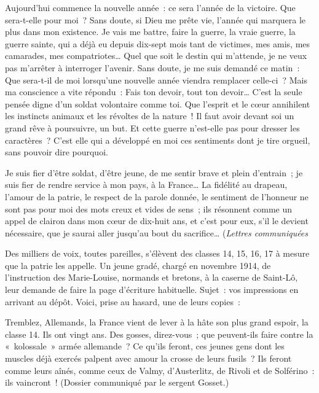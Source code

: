\documentclass[french,twoside]{book} %
\newenvironment{quoteblock}%
  {\begin{quoting}}
  {\end{quoting}}
\newenvironment{quotebar}{%
    \def\FrameCommand{{\color{rubric!10!}\vrule width 0.5em} \hspace{0.9em}}%
    \def\OuterFrameSep{\itemsep} %
    \MakeFramed {\advance\hsize-\width \FrameRestore}
  }%
  {%
    \endMakeFramed
  }
\renewenvironment{quoteblock}%
  {%
    \savenotes
    \setstretch{0.9}
    \normalfont
    \begin{quotebar}
  }
  {%
    \end{quotebar}
    \spewnotes
  }
\begin{document}
\begin{quoteblock}
 \noindent Aujourd’hui commence la nouvelle année : ce sera l’année de la victoire. Que sera-t-elle pour moi ? Sans doute, si Dieu me prête vie, l’année qui marquera le plus dans mon existence. Je vais me battre, faire la guerre, la vraie guerre, la guerre sainte, qui a déjà eu depuis dix-sept mois tant de victimes, mes amis, mes camarades, mes compatriotes… Quel que soit le destin qui m’attende, je ne veux pas m’arrêter à interroger l’avenir. Sans doute, je me suis demandé ce matin : Que sera-t-il de moi lorsqu’une nouvelle année viendra remplacer celle-ci ? Mais ma conscience a vite répondu : Fais ton devoir, tout ton devoir… C’est la seule pensée digne d’un soldat volontaire comme toi. Que l’esprit et le cœur annihilent les instincts animaux et les révoltes de la nature ! Il faut avoir devant soi un grand rêve à poursuivre, un but. Et cette guerre n’est-elle pas pour dresser les caractères ? C’est elle qui a développé en moi ces sentiments dont je tire orgueil, sans pouvoir dire pourquoi.‌\par
 Je suis fier d’être soldat, d’être jeune, de me sentir brave et plein d’entrain ; je suis fier de rendre service à mon pays, à la France… La fidélité au drapeau, l’amour de la patrie, le respect de la parole donnée, le sentiment de l’honneur ne sont pas pour moi des mots creux et vides de sens ; ils résonnent comme un appel de clairon dans mon cœur de dix-huit ans, et c’est pour eux, s’il le devient nécessaire, que je saurai aller jusqu’au bout du sacrifice… ({\itshape Lettres communiquées}‌
 \end{quoteblock}

\noindent Des milliers de voix, toutes pareilles, s’élèvent des classes 14, 15, 16, 17 à mesure que la patrie les appelle. Un jeune gradé, chargé en novembre 1914, de l’instruction des Marie-Louise, normands et bretons, à la caserne de Saint-Lô, leur demande de faire la page d’écriture habituelle. Sujet : vos impressions en arrivant au dépôt. Voici, prise au hasard, une de leurs copies :‌\par

\begin{quoteblock}
 \noindent Tremblez, Allemands, la France vient de lever à la hâte son plus grand espoir, la classe 14. Ils ont vingt ans. Des gosses, direz-vous ; que peuvent-ils faire contre la « kolossale » armée allemande ? Ce qu’ils feront, ces jeunes gens dont les muscles déjà exercés palpent avec amour la crosse de leurs fusils ? Ils feront comme leurs aînés, comme ceux de Valmy, d’Austerlitz, de Rivoli et de Solférino : ils vaincront ! (Dossier communiqué par le sergent Gosset.)‌
 \end{quoteblock}
\end{document}
